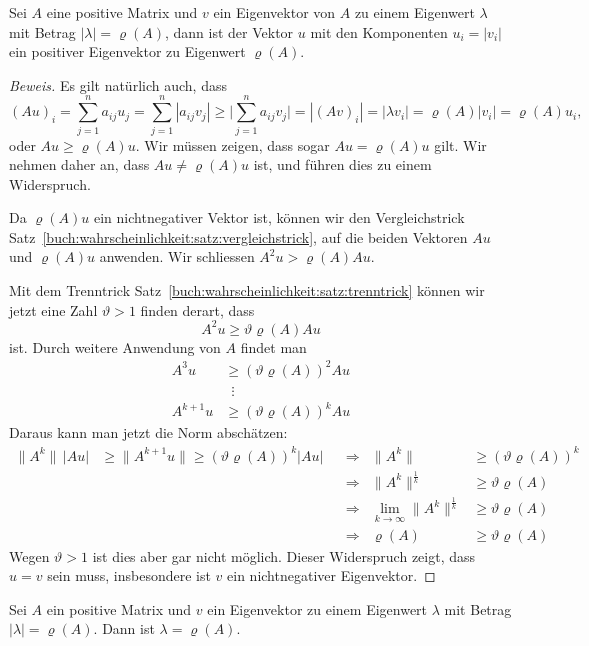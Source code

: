 \begin{satz}
\label{buch:wahrscheinlichkeit:satz:positivereigenvektor}
Sei $A$ eine positive Matrix und $v$ ein Eigenvektor von $A$ zu einem
Eigenwert $\lambda$ mit Betrag $|\lambda|=\varrho(A)$,
dann ist der Vektor $u$  mit den Komponenten $u_i=|v_i|$ ein
positiver Eigenvektor zu Eigenwert $\varrho(A)$.
\end{satz}

\begin{proof}[Beweis]
Es gilt natürlich auch, dass
\[
(Au)_i
=
\sum_{j=1}^n a_{ij}u_j
=
\sum_{j=1}^n |a_{ij}v_j|
\ge
\biggl|
\sum_{j=1}^n a_{ij}v_j
\biggr|
=
|(Av)_i|
=
|\lambda v_i|
=
\varrho(A) |v_i|
=
\varrho(A) u_i,
\]
oder $Au \ge \varrho(A)u$.
Wir müssen zeigen, dass sogar $Au=\varrho(A)u$ gilt.
Wir nehmen daher an, dass $Au\ne \varrho(A)u$ ist, und führen dies zu
einem Widerspruch.

Da $\varrho(A)u$ ein nichtnegativer Vektor ist, können wir den Vergleichstrick
Satz~\ref{buch:wahrscheinlichkeit:satz:vergleichstrick}, auf die beiden
Vektoren $Au$ und $\varrho(A)u$ anwenden.
Wir schliessen $A^2u > \varrho(A)Au$.

Mit dem Trenntrick
Satz~\ref{buch:wahrscheinlichkeit:satz:trenntrick}
können wir jetzt eine Zahl $\vartheta>1$ finden derart, dass
\[
A^2 u \ge \vartheta \varrho(A) Au
\]
ist.
Durch weitere Anwendung von $A$ findet man
\begin{align*}
A^3 u & \ge (\vartheta \varrho(A))^2 Au
\\
&\phantom{0}\vdots
\\
A^{k+1} u & \ge (\vartheta \varrho(A))^{k} Au
\end{align*}
Daraus kann man jetzt die Norm abschätzen:
\[
\begin{aligned}
\| A^{k}\|\, |Au|
&\ge 
\| A^{k+1}u\|
\ge
(\vartheta\varrho(A))^{k} |Au|
&&
\Rightarrow
&
\|A^k\| &\ge  (\vartheta\varrho(A))^k 
\\
&&&\Rightarrow&
\|A^k\|^{\frac{1}{k}} &\ge \vartheta\varrho(A)
\\
&&&\Rightarrow&
\lim_{k\to\infty}
\|A^k\|^{\frac{1}{k}} &\ge \vartheta\varrho(A)
\\
&&&\Rightarrow&
\varrho(A)&\ge \vartheta\varrho(A)
\end{aligned}
\]
Wegen $\vartheta>1$ ist dies aber gar nicht möglich.
Dieser Widerspruch zeigt, dass $u=v$ sein muss, insbesondere ist
$v$ ein nichtnegativer Eigenvektor.
\end{proof}

\begin{satz}
Sei $A$ ein positive Matrix und $v$ ein Eigenvektor zu einem 
Eigenwert $\lambda$ mit Betrag $|\lambda|=\varrho(A)$.
Dann ist $\lambda=\varrho(A)$.
\end{satz}

